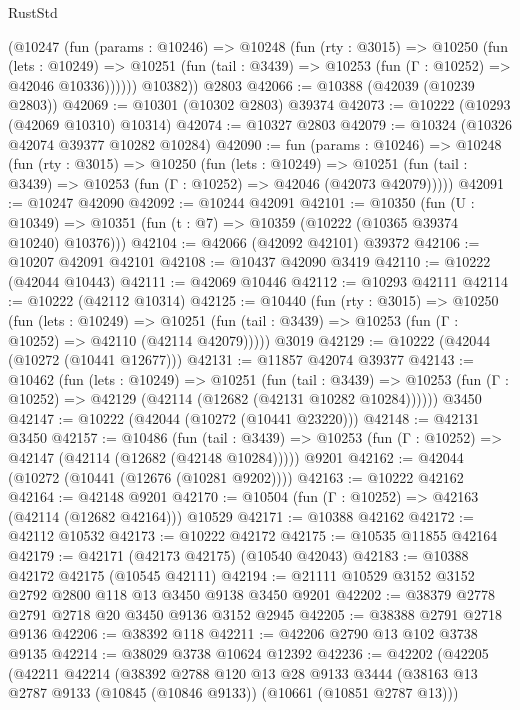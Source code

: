 \begin{lexlean}{RustStd}
\begin{coremodule}
        (@10247
          (fun (params : @10246) =>
          @10248
            (fun (rty : @3015) =>
            @10250
              (fun (lets : @10249) =>
              @10251 (fun (tail : @3439) => @10253 (fun (Γ : @10252) => @42046 @10336))))))
        @10382))
    @2803
@42066 := @10388 (@42039 (@10239 @2803))
@42069 := @10301 (@10302 @2803) @39374
@42073 := @10222 (@10293 (@42069 @10310) @10314)
@42074 := @10327 @2803
@42079 := @10324 (@10326 @42074 @39377 @10282 @10284)
@42090 := fun (params : @10246) =>
  @10248
    (fun (rty : @3015) =>
    @10250
      (fun (lets : @10249) =>
      @10251 (fun (tail : @3439) => @10253 (fun (Γ : @10252) => @42046 (@42073 @42079)))))
@42091 := @10247 @42090
@42092 := @10244 @42091
@42101 := @10350
    (fun (U : @10349) => @10351 (fun (t : @7) => @10359 (@10222 (@10365 @39374 @10240) @10376)))
@42104 := @42066 (@42092 @42101) @39372
@42106 := @10207 @42091 @42101
@42108 := @10437 @42090 @3419
@42110 := @10222 (@42044 @10443)
@42111 := @42069 @10446
@42112 := @10293 @42111
@42114 := @10222 (@42112 @10314)
@42125 := @10440
    (fun (rty : @3015) =>
    @10250
      (fun (lets : @10249) =>
      @10251 (fun (tail : @3439) => @10253 (fun (Γ : @10252) => @42110 (@42114 @42079)))))
    @3019
@42129 := @10222 (@42044 (@10272 (@10441 @12677)))
@42131 := @11857 @42074 @39377
@42143 := @10462
    (fun (lets : @10249) =>
    @10251
      (fun (tail : @3439) =>
      @10253 (fun (Γ : @10252) => @42129 (@42114 (@12682 (@42131 @10282 @10284))))))
    @3450
@42147 := @10222 (@42044 (@10272 (@10441 @23220)))
@42148 := @42131 @3450
@42157 := @10486
    (fun (tail : @3439) => @10253 (fun (Γ : @10252) => @42147 (@42114 (@12682 (@42148 @10284)))))
    @9201
@42162 := @42044 (@10272 (@10441 (@12676 (@10281 @9202))))
@42163 := @10222 @42162
@42164 := @42148 @9201
@42170 := @10504 (fun (Γ : @10252) => @42163 (@42114 (@12682 @42164))) @10529
@42171 := @10388 @42162
@42172 := @42112 @10532
@42173 := @10222 @42172
@42175 := @10535 @11855 @42164
@42179 := @42171 (@42173 @42175) (@10540 @42043)
@42183 := @10388 @42172 @42175 (@10545 @42111)
@42194 := @21111 @10529 @3152 @3152 @2792 @2800 @118 @13 @3450 @9138 @3450 @9201
@42202 := @38379 @2778 @2791 @2718 @20 @3450 @9136 @3152 @2945
@42205 := @38388 @2791 @2718 @9136
@42206 := @38392 @118
@42211 := @42206 @2790 @13 @102 @3738 @9135
@42214 := @38029 @3738 @10624 @12392
@42236 := @42202
    (@42205
      (@42211
        @42214
        (@38392
          @2788
          @120
          @13
          @28
          @9133
          @3444
          (@38163 @13 @2787 @9133 (@10845 (@10846 @9133)) (@10661 (@10851 @2787 @13)))

\end{coremodule}
\end{lexlean}
